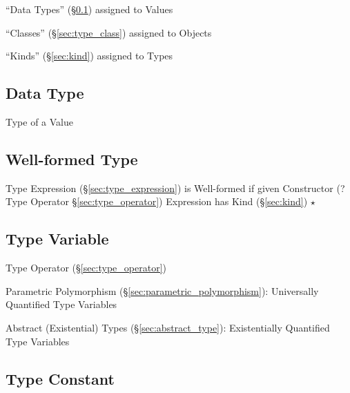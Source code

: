 ``Data Types'' (\S\ref{sec:data_type}) assigned to Values

``Classes'' (\S\ref{sec:type_class}) assigned to Objects

``Kinds'' (\S\ref{sec:kind}) assigned to Types



\subsection{Data Type}\label{sec:data_type}

Type of a Value



\subsection{Well-formed Type}\label{sec:wellformed_type}


Type Expression (\S\ref{sec:type_expression}) is Well-formed if given
Constructor (? Type Operator \S\ref{sec:type_operator}) Expression has
Kind (\S\ref{sec:kind}) $\star$



\subsection{Type Variable}\label{sec:type_variable}

Type Operator (\S\ref{sec:type_operator})

Parametric Polymorphism (\S\ref{sec:parametric_polymorphism}):
Universally Quantified Type Variables

Abstract (Existential) Types (\S\ref{sec:abstract_type}):
Existentially Quantified Type Variables



\subsection{Type Constant}\label{sec:type_constant}

